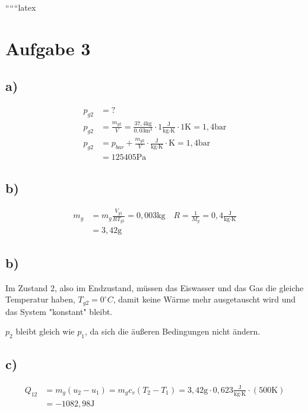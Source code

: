 
``````latex


\section*{Aufgabe 3}

\subsection*{a)}
\begin{align*}
    p_{g2} &= ? \\
    p_{g2} &= \frac{m_{g2}}{V} = \frac{37,4 \text{kg}}{0,03 \text{m}^3} \cdot 1 \frac{\text{J}}{\text{kg} \cdot \text{K}} \cdot 1 \text{K} = 1,4 \text{bar} \\
    p_{g2} &= p_{bar} + \frac{m_{g2}}{V} \cdot \frac{\text{J}}{\text{kg} \cdot \text{K}} \cdot \text{K} = 1,4 \text{bar} \\
    &= 125405 \text{Pa}
\end{align*}

\subsection*{b)}
\begin{align*}
    m_g &= m_g \frac{V_{g1}}{R T_{g1}} = 0,003 \text{kg} \quad R = \frac{1}{M_g} = 0,4 \frac{\text{J}}{\text{kg} \cdot \text{K}} \\
    &= 3,42 \text{g}
\end{align*}

\subsection*{b)}
Im Zustand 2, also im Endzustand, müssen das Eiswasser und das Gas die gleiche Temperatur haben, $T_{g2} = 0^\circ C$, damit keine Wärme mehr ausgetauscht wird und das System "konstant" bleibt.

$p_2$ bleibt gleich wie $p_1$, da sich die äußeren Bedingungen nicht ändern.

\subsection*{c)}
\begin{align*}
    Q_{12} &= m_g (u_2 - u_1) = m_g c_v (T_2 - T_1) = 3,42 \text{g} \cdot 0,623 \frac{\text{J}}{\text{kg} \cdot \text{K}} \cdot (500 \text{K}) \\
    &= -1082,98 \text{J}
\end{align*}

